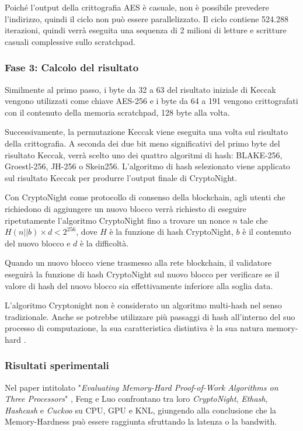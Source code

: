 

Poiché l'output della crittografia AES è casuale, non è possibile prevedere l'indirizzo, quindi il ciclo non può essere parallelizzato. Il ciclo contiene 524.288 iterazioni, quindi verrà eseguita una sequenza di 2 milioni di letture e scritture casuali complessive sullo scratchpad.

\subsubsection*{Fase 3: Calcolo del risultato} 
Similmente al primo passo, i byte da 32 a 63 del risultato iniziale di Keccak vengono utilizzati come chiave AES-256 e i byte da 64 a 191 vengono crittografati con il contenuto della memoria scratchpad, 128 byte alla volta. 

Successivamente, la permutazione Keccak viene eseguita una volta sul risultato della crittografia. A seconda dei due bit meno significativi del primo byte del risultato Keccak, verrà scelto uno dei quattro algoritmi di hash: BLAKE-256, Groestl-256, JH-256 o Skein256. L'algoritmo di hash selezionato viene applicato sul risultato Keccak per produrre l'output finale di CryptoNight.

Con CryptoNight come protocollo di consenso della blockchain, agli utenti che richiedono di aggiungere un nuovo blocco verrà richiesto di eseguire ripetutamente l'algoritmo CryptoNight fino a trovare un nonce $n$ tale che $H(n||b) \times d < 2^{256}$, dove $H$ è la funzione di hash CryptoNight, $b$ è il contenuto del nuovo blocco e $d$ è la difficoltà. 

Quando un nuovo blocco viene trasmesso alla rete blockchain, il validatore eseguirà la funzione di hash CryptoNight sul nuovo blocco per verificare se il valore di hash del nuovo blocco sia effettivamente inferiore alla soglia data.

L'algoritmo Cryptonight non è considerato un algoritmo multi-hash nel senso tradizionale. Anche se potrebbe utilizzare più passaggi di hash all'interno del suo processo di computazione, la sua caratteristica distintiva è la sua natura memory-hard . 



\subsubsection{Risultati sperimentali}
Nel paper intitolato "\textit{Evaluating Memory-Hard Proof-of-Work Algorithms on Three Processors}" \cite{asic_memory_hard}, Feng e Luo confrontano tra loro \textit{CryptoNight}, \textit{Ethash}, \textit{Hashcash} e \textit{Cuckoo} su CPU, GPU e KNL, giungendo alla conclusione che la Memory-Hardness può essere raggiunta sfruttando la latenza o la bandwith.

